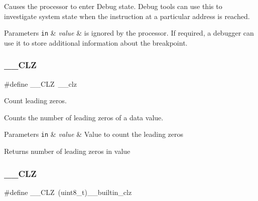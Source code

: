 Causes the processor to enter Debug state. Debug tools can use this to investigate system state when the instruction at a particular address is reached. 
\begin{DoxyParams}[1]{Parameters}
\mbox{\tt in}  & {\em value} & is ignored by the processor. If required, a debugger can use it to store additional information about the breakpoint. \\
\hline
\end{DoxyParams}
\mbox{\label{group___c_m_s_i_s___core___instruction_interface_ga5d5bb1527e042be4a9fa5a33f65cc248}} 
\subsubsection{\texorpdfstring{\+\_\+\+\_\+\+C\+LZ}{\_\_CLZ}\hspace{0.1cm}{\footnotesize\ttfamily [1/3]}}
{\footnotesize\ttfamily \#define \+\_\+\+\_\+\+C\+LZ~\+\_\+\+\_\+clz}



Count leading zeros. 

Counts the number of leading zeros of a data value. 
\begin{DoxyParams}[1]{Parameters}
\mbox{\tt in}  & {\em value} & Value to count the leading zeros \\
\hline
\end{DoxyParams}
\begin{DoxyReturn}{Returns}
number of leading zeros in value 
\end{DoxyReturn}
\mbox{\label{group___c_m_s_i_s___core___instruction_interface_ga5d5bb1527e042be4a9fa5a33f65cc248}} 
\subsubsection{\texorpdfstring{\+\_\+\+\_\+\+C\+LZ}{\_\_CLZ}\hspace{0.1cm}{\footnotesize\ttfamily [2/3]}}
{\footnotesize\ttfamily \#define \+\_\+\+\_\+\+C\+LZ~(uint8\+\_\+t)\+\_\+\+\_\+builtin\+\_\+clz}



